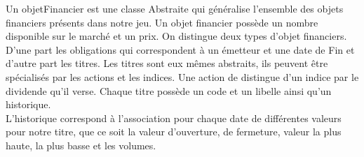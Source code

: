 Un objetFinancier est une classe Abstraite qui généralise l'ensemble des objets financiers présents dans notre jeu. Un objet financier possède un nombre disponible sur le marché et un prix. On distingue deux types d'objet financiers. D'une part les obligations qui correspondent à un émetteur et une date de Fin et d'autre part les titres. Les titres sont eux mêmes abstraits, ils peuvent être spécialisés par les actions et les indices. Une action de distingue d'un indice par le dividende qu'il verse. Chaque titre possède un code et un libelle ainsi qu'un historique. \\

L'historique correspond à l'association pour chaque date de différentes valeurs pour notre titre, que ce soit la valeur d'ouverture, de fermeture, valeur la plus haute, la plus basse et les volumes. 